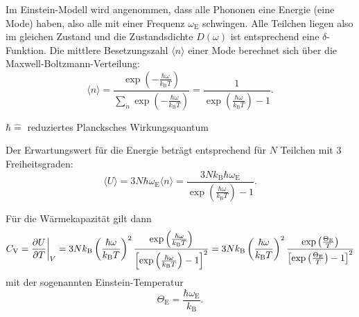 Im Einstein-Modell wird angenommen, dass alle Phononen eine Energie (eine Mode) haben, also alle mit einer Frequenz $\omega_{\text{E}}$ schwingen.
Alle Teilchen liegen also im gleichen Zustand und die Zustandsdichte $D(\omega)$ ist entsprechend eine $\delta$-Funktion.
Die mittlere Besetzungszahl $\langle n \rangle$ einer Mode berechnet sich über die Maxwell-Boltzmann-Verteilung:
\begin{equation*}
	\langle n \rangle = \frac{\exp{ \left( -\frac{\hbar \omega}{k_{\text{B}} T} \right)}}{ \sum_{n} \exp{\left( -\frac{\hbar \omega}{k_{\text{B}} T} \right)}} = \frac{1}{ \exp{ \left( \frac{\hbar \omega}{k_{\text{B}} T} \right)}-1}.
\end{equation*}
\begin{center}
	\tiny{$\hbar \widehat{=}$ reduziertes Plancksches Wirkungsquantum}
\end{center}
Der Erwartungswert für die Energie beträgt entsprechend für $N$ Teilchen mit 3 Freiheitsgraden:
\begin{equation*}
	\langle U \rangle = 3 N  \hbar \omega_{\text{E}} \langle n \rangle  = \frac{3 N k_{\text{B}} \hbar \omega_{\text{E}}}{\exp{\left( \frac{ \hbar \omega }{ k_{\text{B}} T } \right)} - 1}.
\end{equation*}

Für die Wärmekapazität gilt dann
\begin{equation*}
	C_{\text{V}} = \frac{\partial U}{\partial T} \bigg{\vert}_{V} = 3 N k_{\text{B}} \left( \frac{\hbar \omega}{k_{\text{B}} T} \right)^2
	\frac{ \exp{\left( \frac{ \hbar \omega }{ k_{\text{B}} T } \right)} }{ \left[ \exp{\left( \frac{ \hbar \omega }{ k_{\text{B}} T } \right)} - 1 \right]^2 } =
	3 N k_{\text{B}} \left( \frac{\hbar \omega}{k_{\text{B}} T} \right)^2
	\frac{ \exp{\left( \frac{ \Theta_{\text{E}} }{ T } \right)} }{ \left[ \exp{\left( \frac{ \Theta_{\text{E}} }{ T } \right)} - 1 \right]^2 }
\end{equation*}
mit der sogenannten Einstein-Temperatur
\begin{equation*}
	\Theta_{\text{E}} = \frac{\hbar \omega_{\text{E}}}{k_{\text{B}}}.
\end{equation*}

